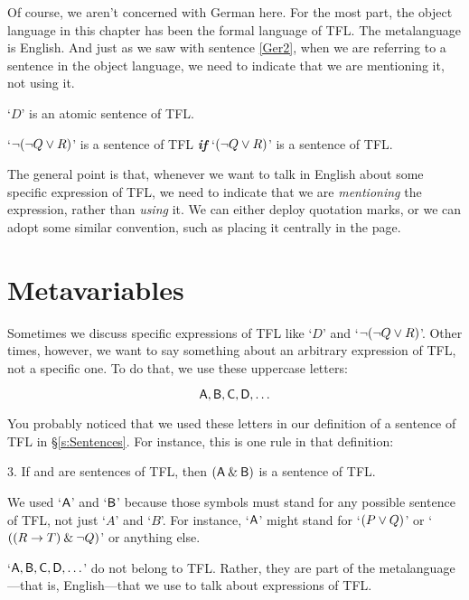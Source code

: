 Of course, we aren't concerned with German here. For the most part, the object language in this chapter has been the formal language of TFL. The metalanguage is English. And just as we saw with sentence \ref{Ger2}, when we are referring to a sentence in the object language, we need to indicate that we are mentioning it, not using it. 
	\begin{earg}
		\item[\ex{obj1}] `$D$' is an atomic sentence of TFL.
		\item[\ex{obj2}] `${\neg} ({\neg} Q \vee R)$' is a sentence of TFL \textit{\textbf{if}} `$({\neg} Q \vee R)$' is a sentence of TFL.
	\end{earg}

The general point is that, whenever we want to talk in English about some specific expression of TFL, we need to indicate that we are \emph{mentioning} the expression, rather than \emph{using} it. We can either deploy quotation marks, or we can adopt some similar convention, such as  placing it centrally in the page. 


\section{Metavariables}\label{s:Metavariables}

Sometimes we discuss specific expressions of TFL like `$D$' and `${\neg} ({\neg} Q \vee R)$'. Other times, however, we want to say something about an arbitrary expression of TFL, not a specific one. To do that, we use these uppercase letters:
	
	$$\mathsf{A}, \mathsf{B}, \mathsf{C}, \mathsf{D}, \ldots$$
	
You probably noticed that we used these letters in our definition of a sentence of TFL in \S\ref{s:Sentences}. For instance, this is one rule in that definition:

\begin{earg}
\item[3.] If  and  are sentences of TFL, then $(\mathsf{A}\mathbin{\&}\mathsf{B})$ is a sentence of TFL.
\end{earg}

We used `$\mathsf{A}$' and `$\mathsf{B}$' because those symbols must stand for any possible sentence of TFL, not just `$A$' and `$B$'. For instance, `$\mathsf{A}$' might stand 
for `$(P \vee Q)$' or `$((R \rightarrow T) \mathbin{\&} {\neg} Q)$' or anything else.

`$\mathsf{A}, \mathsf{B}, \mathsf{C}, \mathsf{D}, \ldots$' do not belong to TFL. Rather, they are part of the metalanguage---that is, English---that we use to talk about expressions of TFL. 
	
